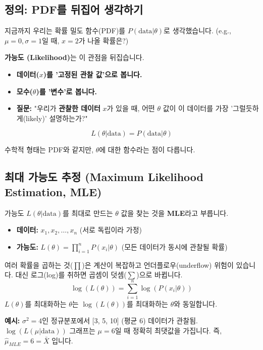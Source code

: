\documentclass[11pt,a4paper]{book}
\theoremstyle{definition}
\begin{document}
\subsection{정의: PDF를 뒤집어 생각하기}

지금까지 우리는 확률 밀도 함수(PDF)를 $P(\text{data} | \theta)$로 생각했습니다.
(e.g., $\mu=0, \sigma=1$일 때, $x=2$가 나올 확률은?)

\textbf{가능도 (Likelihood)}는 이 관점을 뒤집습니다.
\begin{itemize}
    \item \textbf{데이터($x$)를 '고정된 관찰 값'으로 봅니다.}
    \item \textbf{모수($\theta$)를 '변수'로 봅니다.}
    \item \textbf{질문:} "우리가 \textbf{관찰한 데이터} $x$가 있을 때, 어떤 $\theta$ 값이 이 데이터를 가장 '그럴듯하게(likely)' 설명하는가?"
\end{itemize}

$$ L(\theta | \text{data}) = P(\text{data} | \theta) $$

수학적 형태는 PDF와 같지만, $\theta$에 대한 함수라는 점이 다릅니다.

\subsection{최대 가능도 추정 (Maximum Likelihood Estimation, MLE)}

가능도 $L(\theta | \text{data})$를 최대로 만드는 $\theta$ 값을 찾는 것을 \textbf{MLE}라고 부릅니다.

\begin{itemize}
    \item \textbf{데이터:} $x_1, x_2, \dots, x_n$ (서로 독립이라 가정)
    \item \textbf{가능도:} $L(\theta) = \prod_{i=1}^{n} P(x_i | \theta)$ (모든 데이터가 동시에 관찰될 확률)
\end{itemize}

\begin{examplebox}[title=로그 가능도 (Log-Likelihood)]
    여러 확률을 곱하는 것($\prod$)은 계산이 복잡하고 언더플로우(underflow) 위험이 있습니다.
    대신 로그(log)를 취하면 곱셈이 덧셈($\sum$)으로 바뀝니다.
    $$ \log(L(\theta)) = \sum_{i=1}^{n} \log(P(x_i | \theta)) $$
    $L(\theta)$를 최대화하는 $\theta$는 $\log(L(\theta))$를 최대화하는 $\theta$와 동일합니다.

    \textbf{예시:} $\sigma^2=4$인 정규분포에서 [3, 5, 10] (평균 6) 데이터가 관찰됨.
    $\log(L(\mu | \text{data}))$ 그래프는 $\mu=6$일 때 정확히 최댓값을 가집니다. 즉, $\hat{\mu}_{MLE} = 6 = \bar{X}$ 입니다.
\end{examplebox}
\end{document}
